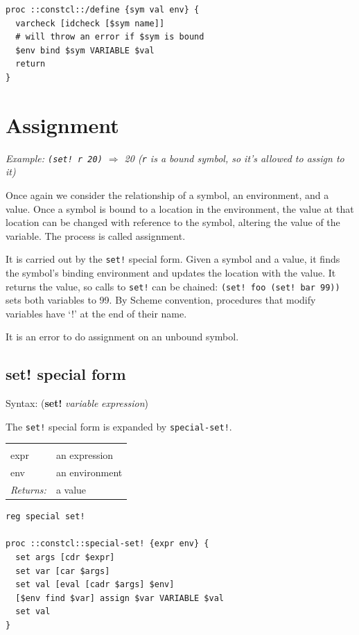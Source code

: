 \documentclass[a5paper,draft]{memoir}
\begin{document}
\begin{lstlisting}
proc ::constcl::/define {sym val env} {
  varcheck [idcheck [$sym name]]
  # will throw an error if $sym is bound
  $env bind $sym VARIABLE $val
  return
}
\end{lstlisting}

\section{Assignment}
\label{assignment}

\emph{Example: \texttt{(set! r 20)} $\Rightarrow$ 20 (\texttt{r} is a bound symbol, so it's allowed to assign to it)}

Once again we consider the relationship of a symbol, an environment, and a value. Once a symbol is bound to a location in the environment, the value at that location can be changed with reference to the symbol, altering the value of the variable. The process is called assignment.

It is carried out by the \texttt{set!} special form. Given a symbol and a value, it finds the symbol's binding environment and updates the location with the value. It returns the value, so calls to \texttt{set!} can be chained: \texttt{(set! foo (set! bar 99))} sets both variables to 99. By Scheme convention, procedures that modify variables have `!' at the end of their name.

It is an error to do assignment on an unbound symbol.

\subsection{set! special form}
\label{set-special-form}

Syntax: (\textbf{set!} \emph{variable} \emph{expression})

The \texttt{set!} special form is expanded by \texttt{special-set!}.

\noindent\begin{tabular}{ |p{1.9cm} p{6.5cm}| }
\hline
\rowcolor[HTML]{CCCCCC} \multicolumn{2}{|l|}{\textbf{special-set! (internal)}} \\
expr & an expression \\
env & an environment \\
\textit{Returns:} & a value \\
\hline
\end{tabular}

\begin{lstlisting}
reg special set!

proc ::constcl::special-set! {expr env} {
  set args [cdr $expr]
  set var [car $args]
  set val [eval [cadr $args] $env]
  [$env find $var] assign $var VARIABLE $val
  set val
}
\end{lstlisting}
\end{document}
